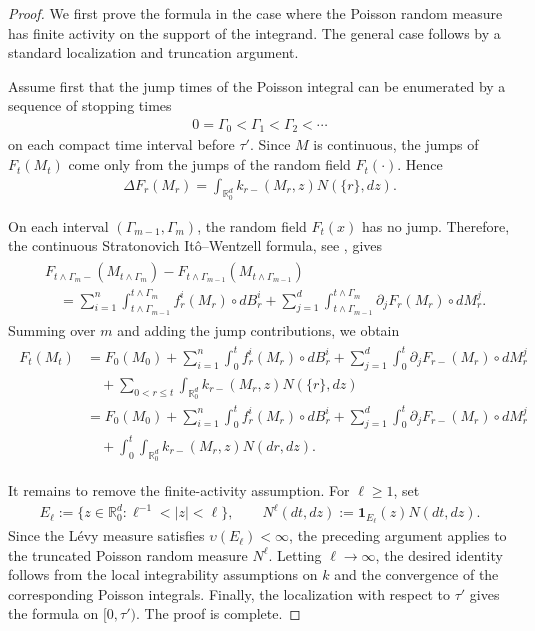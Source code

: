 \documentclass[10pt,a4paper]{amsart}
\newcommand{\ce}{\begin{eqnarray*}}
\newcommand{\de}{\end{eqnarray*}}
\def\geq{\geqslant}
\def\leq{\leqslant}
\numberwithin{equation}{section}
\begin{document}
\begin{proof}
	We first prove the formula in the case where the Poisson random measure has finite activity on the support of the integrand. The general case follows by a standard localization and truncation argument.
	
	Assume first that the jump times of the Poisson integral can be enumerated by a sequence of stopping times
	\ce
	0=\Gamma_0<\Gamma_1<\Gamma_2<\cdots
	\de
	on each compact time interval before $\tau'$. Since $M$ is continuous, the jumps of $F_t(M_t)$ come only from the jumps of the random field $F_t(\cdot)$. Hence
	\ce
	\Delta F_r(M_r)
	=
	\int_{\mathbb R_0^d}k_{r-}(M_r,z)N(\{r\},dz).
	\de
	
	On each interval $(\Gamma_{m-1},\Gamma_m)$, the random field $F_t(x)$ has no jump. Therefore, the continuous Stratonovich Itô--Wentzell formula, see \cite[Chapter 1, Section 8, Theorem 8.3]{dudley1984stochastic}, gives
	\ce
	\begin{aligned}
		&
		F_{t\wedge\Gamma_m-}(M_{t\wedge\Gamma_m})
		-
		F_{t\wedge\Gamma_{m-1}}(M_{t\wedge\Gamma_{m-1}})
		\\
		&\quad =
		\sum_{i=1}^n
		\int_{t\wedge\Gamma_{m-1}}^{t\wedge\Gamma_m}
		f_r^i(M_r)\circ dB_r^i
		+
		\sum_{j=1}^d
		\int_{t\wedge\Gamma_{m-1}}^{t\wedge\Gamma_m}
		\partial_jF_r(M_r)\circ dM_r^j .
	\end{aligned}
	\de
	Summing over $m$ and adding the jump contributions, we obtain
	\ce
	\begin{aligned}
		F_t(M_t)
		&=
		F_0(M_0)
		+
		\sum_{i=1}^n
		\int_0^t f_r^i(M_r)\circ dB_r^i
		+
		\sum_{j=1}^d
		\int_0^t \partial_jF_{r-}(M_r)\circ dM_r^j
		\\
		&\quad
		+
		\sum_{0<r\leq t}
		\int_{\mathbb R_0^d}k_{r-}(M_r,z)N(\{r\},dz)
		\\
		&=
		F_0(M_0)+\sum_{i=1}^n\int_0^t f_r^i(M_r)\circ dB_r^i+	\sum_{j=1}^d
		\int_0^t \partial_jF_{r-}(M_r)\circ dM_r^j	\\
		&\quad+\int_0^t\int_{\mathbb R_0^d}	k_{r-}(M_r,z)N(dr,dz).
	\end{aligned}
	\de
	
	It remains to remove the finite-activity assumption. For $\ell\geq1$, set
	\ce
	E_\ell:=\{z\in\mathbb R_0^d:\ell^{-1}<|z|<\ell\},
	\qquad
	N^\ell(dt,dz):=\mathbf 1_{E_\ell}(z)N(dt,dz).
	\de
	Since the L\'{e}vy measure satisfies $\upsilon(E_\ell)<\infty$, the preceding argument applies to the truncated Poisson random measure $N^\ell$. Letting $\ell\to\infty$, the desired identity follows from the local integrability assumptions on $k$ and the convergence of the corresponding Poisson integrals. Finally, the localization with respect to $\tau'$ gives the formula on $[0,\tau')$. The proof is complete.
\end{proof}
\end{document}
